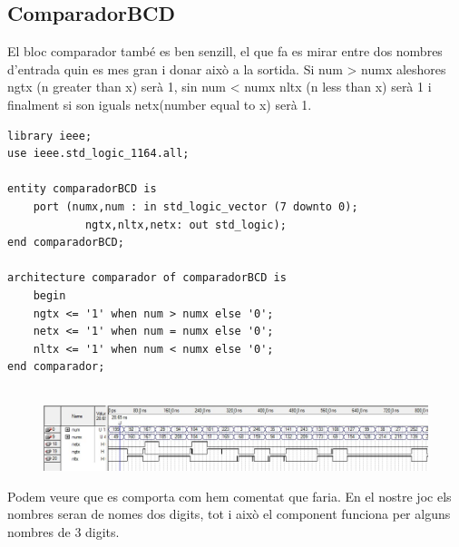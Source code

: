 \documentclass[12pt, a4papre]{article}
\begin{document}
	
\subsection{ComparadorBCD}

	El bloc comparador també es ben senzill, el que fa es mirar entre dos nombres d'entrada quin es mes gran i donar això a la sortida. Si num > numx aleshores ngtx (n greater than x) serà 1, sin num < numx nltx (n less than x) serà 1 i finalment si son iguals netx(number equal to x) serà 1.
		
	\begin{lstlisting}[style=vhdl, frame=single, basicstyle=\tiny]
	library ieee;
use ieee.std_logic_1164.all;

entity comparadorBCD is 
	port (numx,num : in std_logic_vector (7 downto 0);
			ngtx,nltx,netx: out std_logic);
end comparadorBCD;

architecture comparador of comparadorBCD is 
	begin
	ngtx <= '1' when num > numx else '0';
	netx <= '1' when num = numx else '0';
	nltx <= '1' when num < numx else '0';
end comparador;
	
		\end{lstlisting}

\begin{figure}[H]
		\begin{center}
		\includegraphics[width=130mm]{simulacioComparador.jpeg}
		\end{center}
\end{figure}

Podem veure que es comporta com hem comentat que faria. En el nostre joc els nombres seran de nomes dos digits, tot i això el component funciona per alguns nombres de 3 digits.
\end{document}
